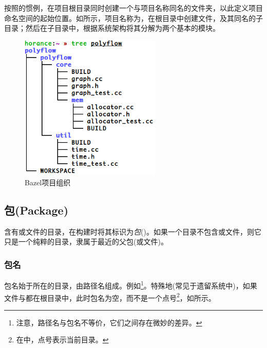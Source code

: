 \begin{content}
按照的惯例，在项目根目录同时创建一个与项目名称同名的文件夹，以此定义项目命名空间的起始位置。如所示，项目名称为，在根目录中创建文件，及其同名的子目录；然后在子目录中，根据系统架构将其分解为两个基本的模块。

\begin{figure}[H]
\centering
\includegraphics[width=0.6\textwidth]{figures/bazel-concept-polyflow.png}
\caption{Bazel项目组织}
 \label{fig:bazel-concept-polyflow}
\end{figure}

\subsection{包(Package)}

含有或文件的目录，在构建时将其标识为\emph{包}()。如果一个目录不包含或文件，则它只是一个纯粹的目录，隶属于最近的父包(或文件)。

\subsubsection{包名}

包名始于所在的目录，由路径名组成。例如\footnote{注意，路径名与包名不等价，它们之间存在微妙的差异。}。特殊地(常见于遗留系统中)，如果文件与都在根目录中，此时包名为空，而不是一个点号\footnote{在中，点号表示当前目录。}，如所示。


\end{content}
